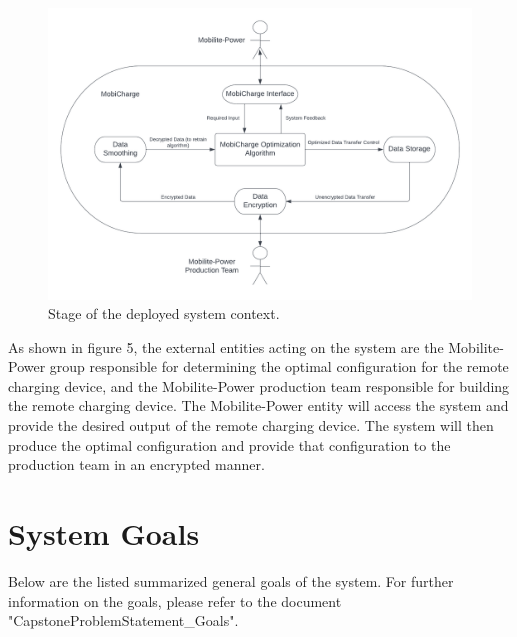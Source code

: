 \documentclass[12pt, titlepage]{article}
\begin{document}
\begin{figure}[h]
    \centering
    \includegraphics[width=15cm]{images/context3.png}
    \caption[Deployed System Contexts 1]{Stage of the deployed system context.}
    \label{fig:figure5}
\end{figure}
As shown in figure 5, the external entities acting on the system are the Mobilite-Power group responsible for determining the optimal configuration for the remote charging device, and the Mobilite-Power production team responsible for building the remote charging device. The Mobilite-Power entity will access the system and provide the desired output of the remote charging device. The system will then produce the optimal configuration and provide that configuration to the production team in an encrypted manner. 

\section{System Goals}
Below are the listed summarized general goals of the system. For further information on the goals, please refer to the document "CapstoneProblemStatement\_Goals".
\end{document}
